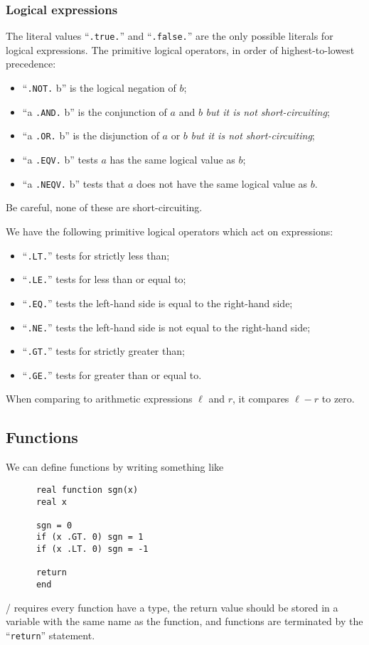 \subsubsection{Logical expressions}
The literal values ``\texttt{.true.}'' and ``\texttt{.false.}'' are the
only possible literals for logical expressions. The primitive logical
operators, in order of highest-to-lowest precedence:
\begin{itemize}
\item ``\texttt{.NOT.} b'' is the logical negation of $b$;
\item ``a \texttt{.AND.} b'' is the conjunction of $a$ and $b$ \emph{but it is not short-circuiting};
\item ``a \texttt{.OR.} b'' is the disjunction of $a$ or $b$ \emph{but it is not short-circuiting};
\item ``a \texttt{.EQV.} b'' tests $a$ has the same logical value as $b$;
\item ``a \texttt{.NEQV.} b'' tests that $a$ does not have the same
  logical value as $b$.
\end{itemize}
Be careful, none of these are short-circuiting.

We have the following primitive logical operators which act on expressions:
\begin{itemize}
\item ``\texttt{.LT.}'' tests for strictly less than;
\item ``\texttt{.LE.}'' tests for less than or equal to;
\item ``\texttt{.EQ.}'' tests the left-hand side is equal to the
  right-hand side;
\item ``\texttt{.NE.}'' tests the left-hand side is not equal to the
  right-hand side;
\item ``\texttt{.GT.}'' tests for strictly greater than;
\item ``\texttt{.GE.}'' tests for greater than or equal to.
\end{itemize}
When comparing to arithmetic expressions $\ell$ and $r$, it compares
$\ell-r$ to zero.

\subsection{Functions}
We can define functions by writing something like

\begin{lstlisting}
      real function sgn(x)
      real x

      sgn = 0
      if (x .GT. 0) sgn = 1
      if (x .LT. 0) sgn = -1

      return
      end
\end{lstlisting}
\FORTRAN/ requires every function have a type, the return value should
be stored in a variable with the same name as the function, and
functions are terminated by the ``\texttt{return}'' statement.

